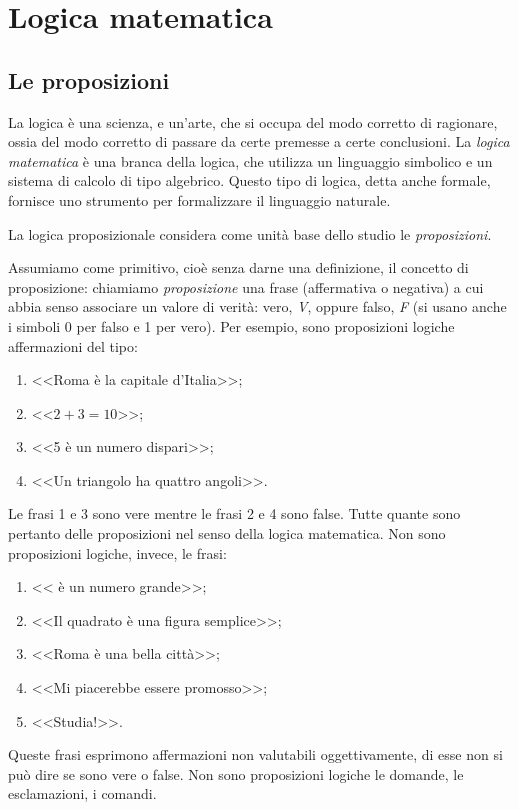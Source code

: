 
\chapter{Logica matematica}

\section{Le proposizioni}

La logica è una scienza, e un'arte, che si occupa del modo corretto di ragionare, ossia del modo corretto di passare da certe premesse a certe conclusioni. La \emph{logica matematica} è una branca della logica, che utilizza un linguaggio simbolico e un sistema di calcolo di tipo algebrico. Questo tipo di logica, detta anche formale, fornisce uno strumento per formalizzare il linguaggio naturale.

La logica proposizionale considera come unità base dello studio le \emph{proposizioni}.

Assumiamo come primitivo, cioè senza darne una definizione, il concetto di proposizione: chiamiamo \emph{proposizione} una frase (affermativa o negativa) a cui abbia senso associare un valore di verità: vero, \emph{V}, oppure falso, \emph{F} (si usano anche i simboli 0 per falso e 1 per vero).
Per esempio, sono proposizioni logiche affermazioni del tipo:
\begin{enumerate}
\item <<Roma è la capitale d'Italia>>;
\item <<$2+3=10$>>;
\item <<5 è un numero dispari>>;
\item <<Un triangolo ha quattro angoli>>.
\end{enumerate}
Le frasi 1 e 3 sono vere mentre le frasi 2 e 4 sono false. Tutte quante sono pertanto delle proposizioni nel senso della logica matematica.
Non sono proposizioni logiche, invece, le frasi:
\begin{enumerate}
\item << è un numero grande>>;
\item <<Il quadrato è una figura semplice>>;
\item <<Roma è una bella città>>;
\item <<Mi piacerebbe essere promosso>>;
\item <<Studia!>>.
\end{enumerate}
Queste frasi esprimono affermazioni non valutabili oggettivamente, di esse non si può dire se sono vere o false. Non sono proposizioni logiche le domande, le esclamazioni, i comandi.

